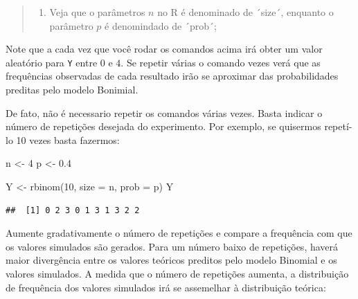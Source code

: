 \documentclass[
]{book}
\newenvironment{Shaded}{\begin{snugshade}}{\end{snugshade}}
\newcommand{\AttributeTok}[1]{\textcolor[rgb]{0.77,0.63,0.00}{#1}}
\newcommand{\DecValTok}[1]{\textcolor[rgb]{0.00,0.00,0.81}{#1}}
\newcommand{\FloatTok}[1]{\textcolor[rgb]{0.00,0.00,0.81}{#1}}
\newcommand{\FunctionTok}[1]{\textcolor[rgb]{0.00,0.00,0.00}{#1}}
\newcommand{\NormalTok}[1]{#1}
\newcommand{\OtherTok}[1]{\textcolor[rgb]{0.56,0.35,0.01}{#1}}
\providecommand{\tightlist}{%
  \setlength{\itemsep}{0pt}\setlength{\parskip}{0pt}}
\begin{document}
\begin{quote}
\begin{enumerate}
\def\labelenumi{\arabic{enumi}.}
\setcounter{enumi}{2}
\tightlist
\item
  Veja que o parâmetros \(n\) no R é denominado de ´size´, enquanto o parâmetro \(p\) é denomindado de ´prob´;
\end{enumerate}
\end{quote}

Note que a cada vez que você rodar os comandos acima irá obter um valor aleatório para \texttt{Y} entre \(0\) e \(4\). Se repetir várias o comando vezes verá que as frequências observadas de cada resultado irão se aproximar das probabilidades preditas pelo modelo Bonimial.

De fato, não é necessario repetir os comandos várias vezes. Basta indicar o número de repetições desejada do experimento. Por exemplo, se quisermos repetí-lo 10 vezes basta fazermos:

\begin{Shaded}
\begin{Highlighting}[]
\NormalTok{n }\OtherTok{\textless{}{-}} \DecValTok{4}
\NormalTok{p }\OtherTok{\textless{}{-}} \FloatTok{0.4}

\NormalTok{Y }\OtherTok{\textless{}{-}} \FunctionTok{rbinom}\NormalTok{(}\DecValTok{10}\NormalTok{, }\AttributeTok{size =}\NormalTok{ n, }\AttributeTok{prob =}\NormalTok{ p)}
\NormalTok{Y}
\end{Highlighting}
\end{Shaded}

\begin{verbatim}
##  [1] 0 2 3 0 1 3 1 3 2 2
\end{verbatim}

Aumente gradativamente o número de repetições e compare a frequência com que os valores simulados são gerados. Para um número baixo de repetições, haverá maior divergência entre os valores teóricos preditos pelo modelo Binomial e os valores simulados. A medida que o número de repetições aumenta, a distribuição de frequência dos valores simulados irá se assemelhar à distribuição teórica:
\end{document}
